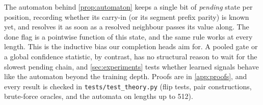 The automaton behind \cref{prop:automaton} keeps a single bit of \emph{pending} state per position,
recording whether its carry-in (or its segment prefix parity) is known yet, and resolves it as soon as
a resolved neighbour passes its value along. The done flag is a pointwise function of this state, and
the same rule works at every length. This is the inductive bias our completion heads aim for. A pooled
gate or a global confidence statistic, by contrast, has no structural reason to wait for the slowest
pending chain, and \cref{sec:experiments} tests whether learned signals behave like the automaton
beyond the training depth. Proofs are in \cref{app:proofs}, and every result is checked in
\texttt{tests/test\_theory.py} (flip tests, pair constructions, brute-force oracles, and the automata on
lengths up to 512).
